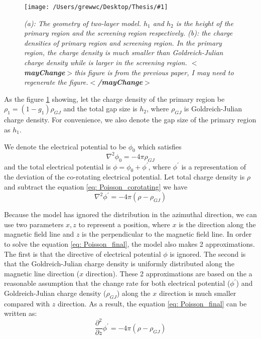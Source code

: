 \documentclass[12pt]{report}
\newcommand{\mycaption}[1]{\caption{\textit{\footnotesize #1}}}
\newcommand{\singleFig}[3]{
 \begin{figure}[!ht]
  \centering
  \texttt{[image: /Users/grewwc/Desktop/Thesis/\#1]}
  \mycaption{#3}
  \label{fig: #1}
 \end{figure} 
}
\newcommand{\gj}[0]{
  Goldreich-Julian charge density
}
\newcommand{\mayChange}[1]{
  $<$\textbf{mayChange}$>$#1$<$\textbf{/mayChange}$>$
}
\newcommand{\myComment}[1]{
  \newline
}
\begin{document}
          \singleFig{charge_density}{0.6}{(a): The geometry of two-layer model. $h_{1}$ and $h_{2}$ is the height
          of the primary region and the screening region respectively. (b): the charge densities of primary region and 
          screening region. In the primary region, the charge density is much smaller than Goldreich-Julian charge density
          while is larger in the screening region. \mayChange{this figure is from the previous paper, I may need to 
          regenerate the figure.}}
      
          As the figure \ref{fig: charge_density} showing, 
          let the charge density of the primary region be $\rho_1 = (1-g_{1}) \rho_{GJ}$ and the total gap size is 
          $h_{2}$, where $\rho_{GJ}$ is Goldreich-Julian charge density. For convenience, 
          we also denote the gap size of the primary region as $h_{1}$. 
          \myComment{Then we can calculate electric potential and electric field by solving the Poisson equation }

          We denote the electrical potential to be $\phi_{0}$ which satisfies 
          \begin{equation}
            \label{eq: Poisson_corotating}
            \nabla^{2}\phi_{0} = -4\pi\rho_{GJ}
          \end{equation}
          and the total electrical potential is $\phi = \phi_{0} + \phi^{\prime}$, where $\phi^{\prime}$ is a 
          representation of the deviation of the co-rotating electrical potential.  
          Let total charge density is $\rho$ and subtract the equation \ref{eq: Poisson_corotating} we have 
          \begin{equation}
            \label{eq: Poisson_final}
            \nabla^{2}\phi^{\prime} = -4\pi\left(\rho - \rho_{GJ} \right)
          \end{equation}

          Because the model has ignored the distribution in the azimuthal direction, we can use two parameters 
          $x, z$ to represent a position, where $x$ is the direction along the magnetic field line and $z$ is the 
          perpendicular to the magnetic field line. In order to solve the equation \ref{eq: Poisson_final}, 
          the model also makes 2 approximations. The first is that the directive of electrical potential $\phi$ 
          is ignored. The second is that the \gj{} is uniformly distributed along the magnetic line direction 
          ($x$ direction). These 2 approximations are based on the a reasonable assumption that the change rate 
          for both electrical potential ($\phi^{\prime}$) and \gj{}($\rho_{GJ}$) along the $x$ direction is much 
          smaller compared with $z$ direction. 
          As a result, the equation \ref{eq: Poisson_final} can be written as: 
          \begin{equation}
            \label{eq: Poisson_final_final}
            \frac{\partial^2}{\partial z} \phi^{\prime} = -4\pi\left(\rho - \rho_{GJ} \right)
          \end{equation}
\end{document}
